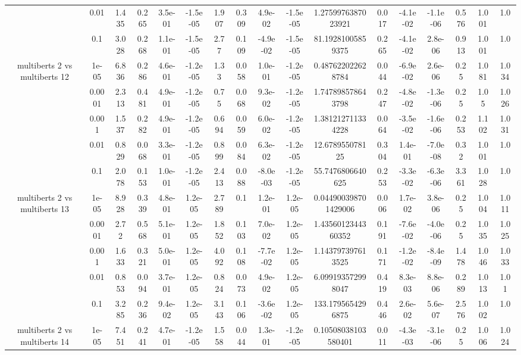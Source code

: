 \begin{tabular}{|c|c|c|c|c|c|c|c|c|c|c|c|c|c|c|c|c|}
 & 0.01 & 1.435 & 0.265 & 3.5e-01 & -1.5e-05 & 1.907 & 0.309 & 4.9e-02 & -1.5e-05 & 1.2759976387023921 & 0.017 & -4.1e-02 & -1.1e-06 & 0.576 & 1.001 & 1.0 \\
 & 0.1 & 3.028 & 0.268 & 1.1e-01 & -1.5e-05 & 2.77 & 0.109 & -4.9e-02 & -1.5e-05 & 81.19281005859375 & 0.265 & -4.1e-02 & 2.8e-06 & 0.913 & 1.001 & 1.0 \\
\hline
\multirow{5}{*}{multiberts 2 vs multiberts 12} & 1e-05 & 6.836 & 0.286 & 4.6e-01 & -1.2e-05 & 1.33 & 0.058 & 1.0e-01 & -1.2e-05 & 0.487622022628784 & 0.044 & -6.9e-02 & 2.6e-06 & 0.25 & 1.081 & 1.034 \\
 & 0.0001 & 2.313 & 0.481 & 4.9e-01 & -1.2e-05 & 0.75 & 0.068 & 9.3e-02 & -1.2e-05 & 1.747898578643798 & 0.247 & -4.8e-02 & -1.3e-06 & 0.25 & 1.05 & 1.026 \\
 & 0.001 & 1.537 & 0.282 & 4.9e-01 & -1.2e-05 & 0.694 & 0.059 & 6.0e-02 & -1.2e-05 & 1.381212711334228 & 0.064 & -3.5e-02 & -1.6e-06 & 0.253 & 1.102 & 1.031 \\
 & 0.01 & 0.829 & 0.068 & 3.3e-01 & -1.2e-05 & 0.899 & 0.084 & 6.3e-02 & -1.2e-05 & 12.678955078125 & 0.304 & 1.4e-01 & -7.0e-08 & 0.32 & 1.001 & 1.0 \\
 & 0.1 & 2.078 & 0.153 & 1.0e-01 & -1.2e-05 & 2.413 & 0.088 & -8.0e-03 & -1.2e-05 & 55.7476806640625 & 0.253 & -3.3e-02 & -6.3e-06 & 3.361 & 1.028 & 1.0 \\
\hline
\multirow{5}{*}{multiberts 2 vs multiberts 13} & 1e-05 & 8.928 & 0.339 & 4.8e-01 & 1.2e-05 & 2.789 & 0.1 & 1.2e-01 & 1.2e-05 & 0.044900398701429006 & 0.006 & 1.7e-02 & 3.8e-06 & 0.25 & 1.004 & 1.011 \\
 & 0.0001 & 2.72 & 0.568 & 5.1e-01 & 1.2e-05 & 1.852 & 0.103 & 7.0e-02 & 1.2e-05 & 1.4356012344360352 & 0.191 & -7.6e-02 & -4.0e-06 & 0.25 & 1.035 & 1.025 \\
 & 0.001 & 1.633 & 0.321 & 5.0e-01 & 1.2e-05 & 4.092 & 0.108 & -7.7e-02 & 1.2e-05 & 1.143797397613525 & 0.171 & -1.2e-02 & -8.4e-09 & 1.478 & 1.046 & 1.033 \\
 & 0.01 & 0.853 & 0.094 & 3.7e-01 & 1.2e-05 & 0.824 & 0.073 & 4.9e-02 & 1.2e-05 & 6.099193572998047 & 0.419 & 8.3e-03 & 8.8e-06 & 0.289 & 1.013 & 1.01 \\
 & 0.1 & 3.285 & 0.236 & 9.4e-02 & 1.2e-05 & 3.143 & 0.106 & -3.6e-02 & 1.2e-05 & 133.1795654296875 & 0.446 & 2.6e-02 & 5.6e-07 & 2.576 & 1.002 & 1.0 \\
\hline
\multirow{5}{*}{multiberts 2 vs multiberts 14} & 1e-05 & 7.451 & 0.241 & 4.7e-01 & -1.2e-05 & 1.558 & 0.044 & 1.3e-01 & -1.2e-05 & 0.10508038103580401 & 0.011 & -4.3e-03 & -3.1e-06 & 0.25 & 1.006 & 1.024 \\

\end{tabular}
